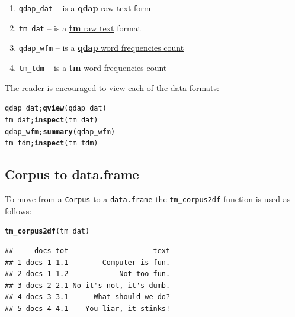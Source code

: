 \documentclass{article}\usepackage[]{graphicx}\usepackage[]{color}
\makeatletter
\newcommand{\hlstd}[1]{\textcolor[rgb]{0.345,0.345,0.345}{#1}}%
\newcommand{\hlkwd}[1]{\textcolor[rgb]{0.737,0.353,0.396}{\textbf{#1}}}%
\newenvironment{kframe}{%
 \def\at@end@of@kframe{}%
 \ifinner\ifhmode%
  \def\at@end@of@kframe{\end{minipage}}%
  \begin{minipage}{\columnwidth}%
 \fi\fi%
 \def\FrameCommand##1{\hskip\@totalleftmargin \hskip-\fboxsep
 \colorbox{shadecolor}{##1}\hskip-\fboxsep
     \hskip-\linewidth \hskip-\@totalleftmargin \hskip\columnwidth}%
 \MakeFramed {\advance\hsize-\width
   \@totalleftmargin\z@ \linewidth\hsize
   \@setminipage}}%
 {\par\unskip\endMakeFramed%
 \at@end@of@kframe}
\newenvironment{knitrout}{}{} %
\makeatother
\begin{document}
\begin{enumerate}
  \item \texttt{qdap\_dat} -- is a \underline{\textbf{qdap} raw text} form
  \item \texttt{tm\_dat} -- is a \underline{\textbf{tm} raw text} format
  \item \texttt{qdap\_wfm} -- is a \underline{\textbf{qdap} word frequencies count}
  \item \texttt{tm\_tdm} -- is a \underline{\textbf{tm} word frequencies count}
\end{enumerate}

\noindent The reader is encouraged to view each of the data formats:

\begin{knitrout}
\color{fgcolor}\begin{kframe}
\begin{alltt}
\hlstd{qdap_dat;} \hlkwd{qview}\hlstd{(qdap_dat)}
\hlstd{tm_dat;} \hlkwd{inspect}\hlstd{(tm_dat)}
\hlstd{qdap_wfm;} \hlkwd{summary}\hlstd{(qdap_wfm)}
\hlstd{tm_tdm;} \hlkwd{inspect}\hlstd{(tm_tdm)}
\end{alltt}
\end{kframe}
\end{knitrout}



\subsection{Corpus to data.frame}

\hspace{.4cm} To move from a \texttt{Corpus} to a \texttt{data.frame} the \texttt{tm\_corpus2df} function is used as follows:

\begin{knitrout}
\color{fgcolor}\begin{kframe}
\begin{alltt}
\hlkwd{tm_corpus2df}\hlstd{(tm_dat)}
\end{alltt}
\end{kframe}
\end{knitrout}


\begin{knitrout}
\color{fgcolor}\begin{kframe}
\begin{verbatim}
##     docs tot                    text
## 1 docs 1 1.1        Computer is fun.
## 2 docs 1 1.2            Not too fun.
## 3 docs 2 2.1 No it's not, it's dumb.
## 4 docs 3 3.1      What should we do?
## 5 docs 4 4.1    You liar, it stinks!
\end{verbatim}
\end{kframe}
\end{knitrout}
\end{document}
